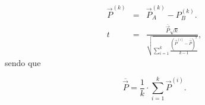 \begin{eqnarray}
\vec{P}^{(k)} &=& \vec{P}_A^{(k)}-P_B^{(k)}\label{eq:tstudentDif}. \\ 
t &=& \frac{\overline{\vec{P}}\sqrt{k}}{\sqrt{\sum\limits_{i=1}^{k}\frac{(\vec{P}^{(i)}-\overline{\vec{P}})^2}{k-1}}}, \label{eq:Disttudent} 
\end{eqnarray}
sendo que

\begin{equation}
\overline{\vec{P}} = \frac{1}{k}\cdot\sum\limits_{i=1}^{k} \vec{P}^{(i)}. \label{eq:Eqstudent} 
\end{equation}

%
%
%
